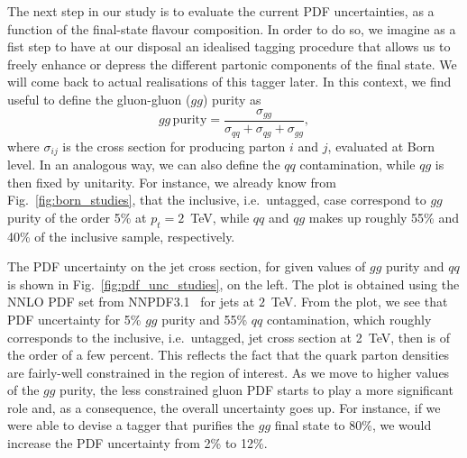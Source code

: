 The next step in our study is to evaluate the current PDF uncertainties, as a function of the final-state flavour composition. 
%
In order to do so, we imagine as a fist step to have at our disposal an idealised tagging procedure that allows us to freely enhance or depress the different partonic components of the final state. We will come back to actual realisations of this tagger later. 
%
In this context, we find useful to define the gluon-gluon ($gg$) purity as
\begin{equation}\label{gg-purity}
gg \, \text{purity}= \frac{\sigma_{gg}}{\sigma_{qq}+\sigma_{qg}+\sigma_{gg}},
\end{equation}
where $\sigma_{ij}$ is the cross section for producing parton $i$ and $j$, evaluated at Born level.  In an analogous way, we can also define the $q q$ contamination, while $q g$ is then fixed by unitarity. 
%
For instance, we already know from Fig.~\ref{fig:born_studies}, that the inclusive, i.e.\ untagged, case correspond to $gg$ purity of the order 5\% at $p_t=2$~TeV, while $qq$ and $qg$ makes up roughly 55\% and 40\% of the inclusive sample, respectively. 

%
The PDF uncertainty on the jet cross section, for given values of $gg$ purity and $qq$ is shown in Fig.~\ref{fig:pdf_unc_studies}, on the left. The plot is obtained using the NNLO PDF set from NNPDF3.1~\cite{Ball:2017nwa} for jets at $2$~TeV.
%
%
From the plot, we see that PDF uncertainty for 5\% $gg$ purity and 55\% $qq$ contamination, which roughly corresponds to the inclusive, i.e.\ untagged, jet cross section at 2~TeV, then is of the order of a few percent.
%
This reflects the fact that the quark parton densities are fairly-well constrained in the region of interest. 
%
As we move to higher values of the $gg$ purity, the less constrained gluon PDF starts to play a more significant role and, as a consequence, the overall uncertainty goes up. For instance, if we were able to devise a tagger that purifies the $gg$ final state to 80\%, we would increase the PDF uncertainty from 2\% to 12\%. 

